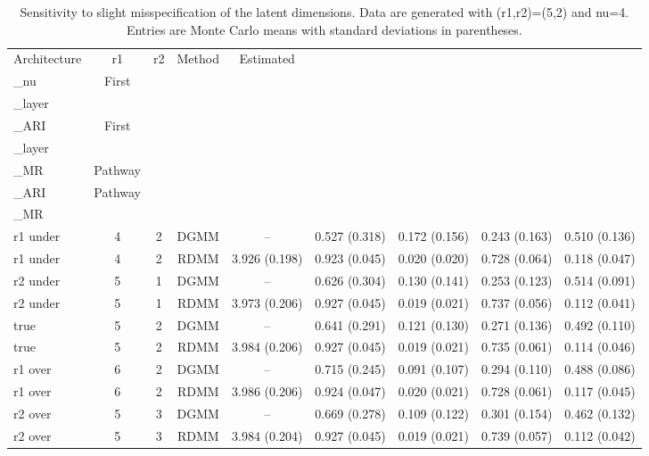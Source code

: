 \begin{table}[!ht]
\centering
\caption{Sensitivity to slight misspecification of the latent dimensions. Data are generated with (r1,r2)=(5,2) and nu=4. Entries are Monte Carlo means with standard deviations in parentheses.}
\label{tab:dimension-sensitivity}
\begin{tabular}{lcccccccc}
\hline
Architecture & r1 & r2 & Method & Estimated\\_nu & First\\_layer\\_ARI & First\\_layer\\_MR & Pathway\\_ARI & Pathway\\_MR \\
\hline
r1 under & 4 & 2 & DGMM & -- & 0.527 (0.318) & 0.172 (0.156) & 0.243 (0.163) & 0.510 (0.136) \\
r1 under & 4 & 2 & RDMM & 3.926 (0.198) & 0.923 (0.045) & 0.020 (0.020) & 0.728 (0.064) & 0.118 (0.047) \\
r2 under & 5 & 1 & DGMM & -- & 0.626 (0.304) & 0.130 (0.141) & 0.253 (0.123) & 0.514 (0.091) \\
r2 under & 5 & 1 & RDMM & 3.973 (0.206) & 0.927 (0.045) & 0.019 (0.021) & 0.737 (0.056) & 0.112 (0.041) \\
true & 5 & 2 & DGMM & -- & 0.641 (0.291) & 0.121 (0.130) & 0.271 (0.136) & 0.492 (0.110) \\
true & 5 & 2 & RDMM & 3.984 (0.206) & 0.927 (0.045) & 0.019 (0.021) & 0.735 (0.061) & 0.114 (0.046) \\
r1 over & 6 & 2 & DGMM & -- & 0.715 (0.245) & 0.091 (0.107) & 0.294 (0.110) & 0.488 (0.086) \\
r1 over & 6 & 2 & RDMM & 3.986 (0.206) & 0.924 (0.047) & 0.020 (0.021) & 0.728 (0.061) & 0.117 (0.045) \\
r2 over & 5 & 3 & DGMM & -- & 0.669 (0.278) & 0.109 (0.122) & 0.301 (0.154) & 0.462 (0.132) \\
r2 over & 5 & 3 & RDMM & 3.984 (0.204) & 0.927 (0.045) & 0.019 (0.021) & 0.739 (0.057) & 0.112 (0.042) \\
\hline
\end{tabular}
\end{table}
